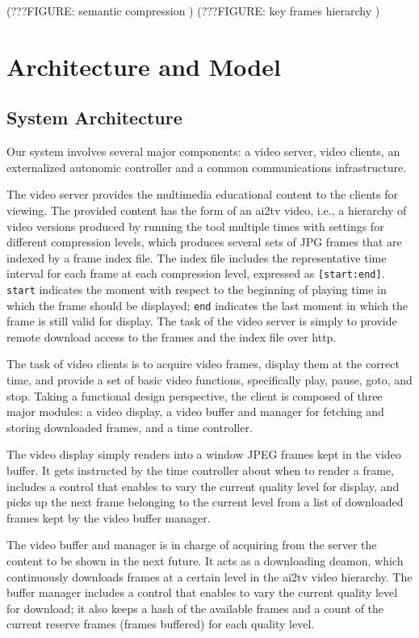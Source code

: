 \documentclass{sig-alternate}
\begin{document}
(???FIGURE: semantic compression )
(???FIGURE: key frames hierarchy )

\section{Architecture and Model} \label{design}
\subsection{System Architecture}
Our system involves several major components: a video server, video
clients, an externalized autonomic controller and a common
communications infrastructure.

The video server provides the multimedia educational content to the
clients for viewing.  The provided content has the form of an ai2tv
video, i.e., a hierarchy of video versions produced by running the
tool multiple times with settings for different compression levels,
which produces several sets of JPG frames that are indexed by a frame
index file. The index file includes the representative time interval
for each frame at each compression level, expressed as
\texttt{[start:end]}.  \texttt{start} indicates the moment with
respect to the beginning of playing time in which the frame should be
displayed; \texttt{end} indicates the last moment in which the frame
is still valid for display.  The task of the video server is simply to
provide remote download access to the frames and the index file over
http.

The task of video clients is to acquire video frames, display them at
the correct time, and provide a set of basic video functions,
specifically play, pause, goto, and stop.  Taking a functional design
perspective, the client is composed of three major modules: a video
display, a video buffer and manager for fetching and storing
downloaded frames, and a time controller.

The video display simply renders into a window JPEG frames kept in the
video buffer.  It gets instructed by the time controller about when to
render a frame, includes a control that enables to vary the current
quality level for display, and picks up the next frame belonging to
the current level from a list of downloaded frames kept by the video
buffer manager.

The video buffer and manager is in charge of acquiring from the server
the content to be shown in the next future.  It acts as a downloading
deamon, which continuously downloads frames at a certain level in the
ai2tv video hierarchy. The buffer manager includes a control that
enables to vary the current quality level for download; it also keeps
a hash of the available frames and a count of the current reserve
frames (frames buffered) for each quality level.
\end{document}
